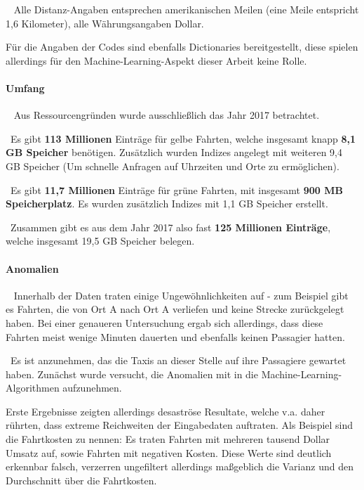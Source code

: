 ~\newline
Alle Distanz-Angaben entsprechen amerikanischen Meilen (eine Meile entspricht 1,6 Kilometer), alle Währungsangaben Dollar. 

Für die Angaben der Codes sind ebenfalls Dictionaries bereitgestellt, diese spielen allerdings für den Machine-Learning-Aspekt dieser Arbeit keine Rolle.
\paragraph{Umfang} ~\newline
Aus Ressourcengründen wurde ausschließlich das Jahr 2017 betrachtet. 

~\newline Es gibt \textbf{113 Millionen} Einträge für gelbe Fahrten, welche insgesamt knapp \textbf{8,1 GB Speicher} benötigen. Zusätzlich wurden Indizes angelegt mit weiteren 9,4 GB Speicher (Um schnelle Anfragen auf Uhrzeiten und Orte zu ermöglichen).

~\newline Es gibt \textbf{11,7 Millionen} Einträge für grüne Fahrten, mit insgesamt \textbf{900 MB Speicherplatz}. Es wurden zusätzlich Indizes mit 1,1 GB Speicher erstellt. 

~\newline Zusammen gibt es aus dem Jahr 2017 also fast \textbf{125 Millionen Einträge}, welche insgesamt 19,5 GB Speicher belegen.
\paragraph{Anomalien} ~\newline
Innerhalb der Daten traten einige Ungewöhnlichkeiten auf - zum Beispiel gibt es Fahrten, die von Ort A nach Ort A verliefen und keine Strecke zurückgelegt haben. Bei einer genaueren Untersuchung ergab sich allerdings, dass diese Fahrten meist wenige Minuten dauerten und ebenfalls keinen Passagier hatten. 

~\newline Es ist anzunehmen, das die Taxis an dieser Stelle auf ihre Passagiere gewartet haben. Zunächst wurde versucht, die Anomalien mit in die Machine-Learning-Algorithmen aufzunehmen. 

Erste Ergebnisse zeigten allerdings desaströse Resultate, welche v.a. daher rührten, dass extreme Reichweiten der Eingabedaten auftraten. Als Beispiel sind die Fahrtkosten zu nennen: Es traten Fahrten mit mehreren tausend Dollar Umsatz auf, sowie Fahrten mit negativen Kosten. Diese Werte sind deutlich erkennbar falsch, verzerren ungefiltert allerdings maßgeblich die Varianz und den Durchschnitt über die Fahrtkosten.  

